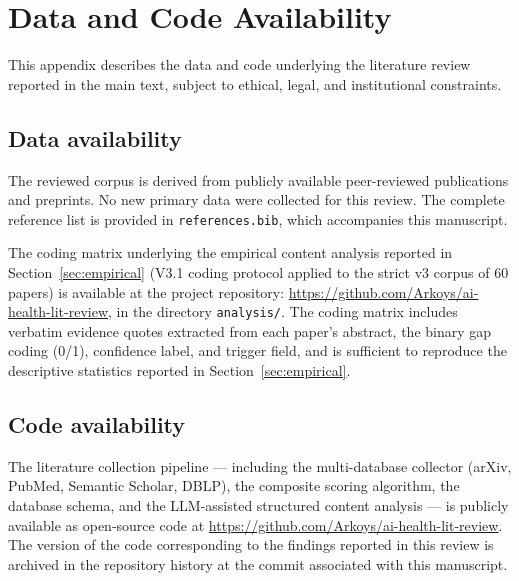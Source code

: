 
\section*{Data and Code Availability}

This appendix describes the data and code underlying the literature
review reported in the main text, subject to ethical, legal, and
institutional constraints.

\subsection*{Data availability}

The reviewed corpus is derived from publicly available peer-reviewed
publications and preprints. No new primary data were collected for
this review. The complete reference list is provided in
\texttt{references.bib}, which accompanies this manuscript.

The coding matrix underlying the empirical content analysis reported
in Section~\ref{sec:empirical} (V3.1 coding protocol applied to the
strict v3 corpus of 60 papers) is available at the project repository:
\url{https://github.com/Arkoys/ai-health-lit-review}, in the directory
\texttt{analysis/}. The coding matrix includes verbatim evidence
quotes extracted from each paper's abstract, the binary gap coding
(0/1), confidence label, and trigger field, and is sufficient to
reproduce the descriptive statistics reported in Section~\ref{sec:empirical}.

\subsection*{Code availability}

The literature collection pipeline --- including the multi-database
collector (arXiv, PubMed, Semantic Scholar, DBLP), the composite
scoring algorithm, the database schema, and the LLM-assisted
structured content analysis --- is publicly available as open-source
code at \url{https://github.com/Arkoys/ai-health-lit-review}. The
version of the code corresponding to the findings reported in this
review is archived in the repository history at the commit associated
with this manuscript.

